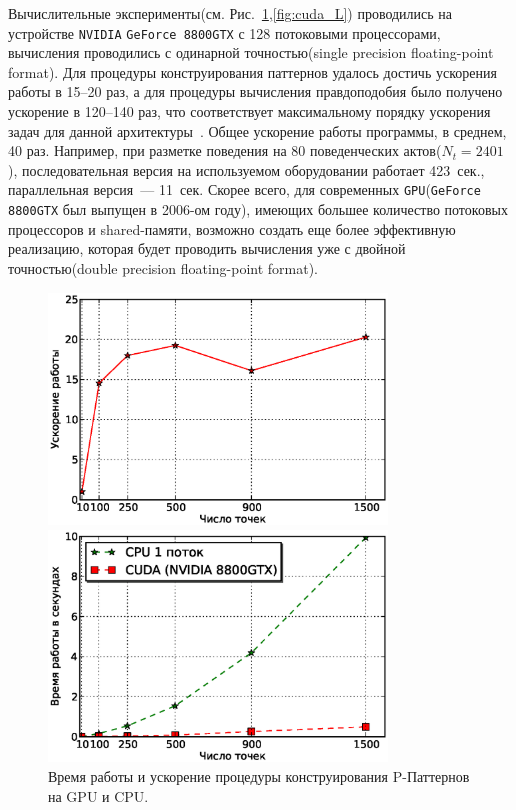 \documentclass[12pt,fсeqn]{article}
\begin{document}
Вычислительные эксперименты(см. Рис.~\ref{fig:cuda_D},\ref{fig:cuda_L}) проводились на устройстве \verb!NVIDIA! \verb!GeForce 8800GTX! 
с 128 потоковыми процессорами, вычисления проводились с одинарной 
точностью(single precision floating-point format). Для процедуры конструирования паттернов удалось достичь ускорения работы в 15--20 раз, а для процедуры вычисления правдоподобия
было получено ускорение в 120--140 раз, что соответствует максимальному порядку ускорения задач для данной архитектуры~\cite{CUDA_showcase}. Общее ускорение
работы программы, в среднем, 40 раз. Например, при разметке поведения на 80 поведенческих актов($N_t=2401$), последовательная версия на используемом
оборудовании работает 423~сек., параллельная версия~--- 11~сек. 
Скорее всего, для современных \verb!GPU!(\verb!GeForce 8800GTX! был выпущен в 2006-ом году), имеющих большее количество потоковых процессоров и shared-памяти, возможно
создать еще более эффективную реализацию, которая будет проводить вычисления уже с двойной точностью(double precision floating-point format). 

\begin{figure}[H]
	\begin{multicols}{2}
	\hfill
	\includegraphics[width=90mm]{cuD_su.eps}

	\includegraphics[width=90mm]{cuD_t.eps}
	\end{multicols}
	\caption{Время работы и ускорение процедуры конструирования P-Паттернов на GPU и CPU.}
\label{fig:cuda_D}
\end{figure}
\end{document}
